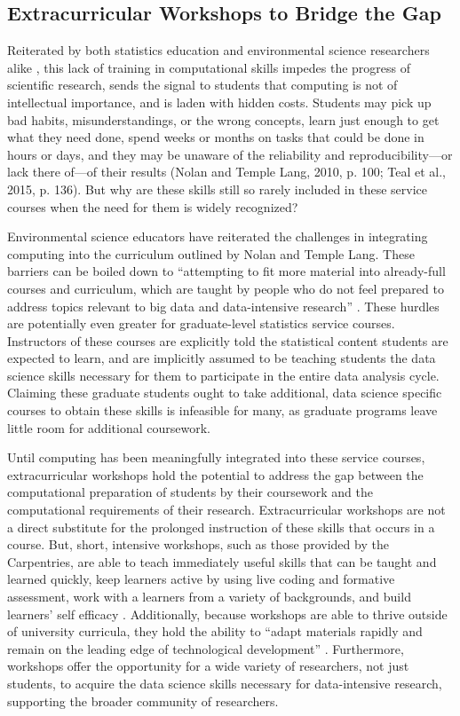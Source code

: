 \documentclass[12pt]{article}
\begin{document}
\subsection{Extracurricular Workshops to Bridge the Gap}

\quad Reiterated by both statistics education and environmental science 
researchers alike \citep{nolan, datacarpentry}, this lack of training in 
computational skills impedes the progress of scientific research, sends the 
signal to students that computing is not of intellectual importance, and is 
laden with hidden costs. Students may pick up bad habits, misunderstandings, or 
the wrong concepts, learn just enough to get what they need done, spend weeks or
months on tasks that could be done in hours or days, and they may be unaware of 
the reliability and reproducibility---or lack there of---of their results (Nolan
and Temple Lang, 2010, p. 100; Teal et al., 2015, p. 136). But why are these
skills still so rarely included in these service courses when the need for them
is widely recognized?

\quad Environmental science educators have reiterated the challenges in 
integrating computing into the curriculum outlined by Nolan and Temple Lang. 
These barriers can be boiled down to ``attempting to fit more material into
already-full courses and curriculum, which are taught by people who do not feel
prepared to address topics relevant to big data and data-intensive research'' 
\citep[p. 547]{hampton}. These hurdles are potentially even greater for 
graduate-level statistics service courses. Instructors of these courses are 
explicitly told the statistical content students are expected to learn, 
and are implicitly assumed to be teaching students the data science skills 
necessary for them to participate in the entire data analysis cycle. Claiming 
these graduate students ought to take additional, data science specific courses
to obtain these skills is infeasible for many, as graduate programs leave little
room for additional coursework. 

\quad Until computing has been meaningfully integrated into these service 
courses, extracurricular workshops hold the potential to address the gap between
the computational preparation of students by their coursework and the 
computational requirements of their research. Extracurricular workshops are
not a direct substitute for the prolonged instruction of these skills that
occurs in a course. But, short, intensive workshops, such as those provided by 
the Carpentries, are able to teach immediately useful skills that can be taught
and learned quickly, keep learners active by using live coding and formative 
assessment, work with a learners from a variety of backgrounds, and build
learners' self efficacy \citep{null-carpentries}. Additionally, because
workshops are able to thrive outside of university curricula, they hold the
ability to ``adapt materials rapidly and remain on the leading edge of
technological development'' \citep[p. 547]{hampton}. Furthermore, workshops
offer the opportunity for a wide variety of researchers, not just students, to
acquire the data science skills necessary for data-intensive research, 
supporting the broader community of researchers. 
\end{document}

